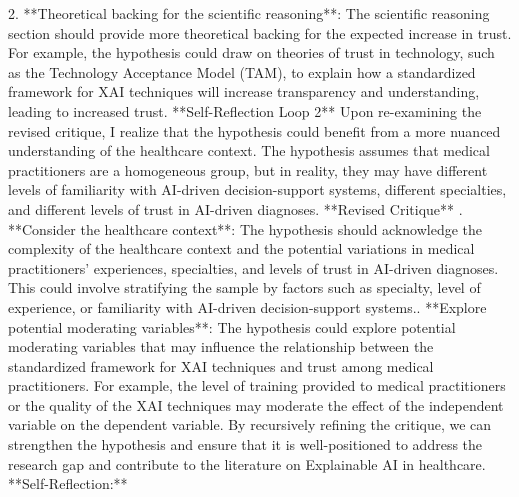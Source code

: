 \documentclass{article}%
\begin{document}
2. **Theoretical backing for the scientific reasoning**: The scientific reasoning section should provide more theoretical backing for the expected increase in trust. For example, the hypothesis could draw on theories of trust in technology, such as the Technology Acceptance Model (TAM), to explain how a standardized framework for XAI techniques will increase transparency and understanding, leading to increased trust.\newline%
\newline%
**Self{-}Reflection Loop 2**\newline%
\newline%
Upon re{-}examining the revised critique, I realize that the hypothesis could benefit from a more nuanced understanding of the healthcare context. The hypothesis assumes that medical practitioners are a homogeneous group, but in reality, they may have different levels of familiarity with AI{-}driven decision{-}support systems, different specialties, and different levels of trust in AI{-}driven diagnoses.\newline%
\newline%
**Revised Critique**\newline%
. **Consider the healthcare context**: The hypothesis should acknowledge the complexity of the healthcare context and the potential variations in medical practitioners' experiences, specialties, and levels of trust in AI{-}driven diagnoses. This could involve stratifying the sample by factors such as specialty, level of experience, or familiarity with AI{-}driven decision{-}support systems.. **Explore potential moderating variables**: The hypothesis could explore potential moderating variables that may influence the relationship between the standardized framework for XAI techniques and trust among medical practitioners. For example, the level of training provided to medical practitioners or the quality of the XAI techniques may moderate the effect of the independent variable on the dependent variable.\newline%
\newline%
By recursively refining the critique, we can strengthen the hypothesis and ensure that it is well{-}positioned to address the research gap and contribute to the literature on Explainable AI in healthcare.\newline%
\newline%
**Self{-}Reflection:**\newline%
\end{document}
